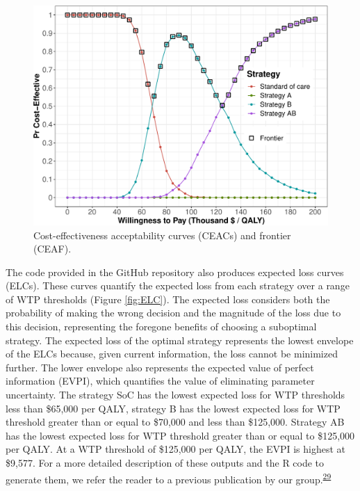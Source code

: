 \documentclass[
]{article}
\begin{document}
\begin{figure}[H]

{\centering \includegraphics{figs/CEAC-1} 

}

\caption{Cost-effectiveness acceptability curves (CEACs) and frontier (CEAF).}\label{fig:CEAC}
\end{figure}

The code provided in the GitHub repository also produces expected loss curves (ELCs). These curves quantify the expected loss from each strategy over a range of WTP thresholds (Figure \ref{fig:ELC}). The expected loss considers both the probability of making the wrong decision and the magnitude of the loss due to this decision, representing the foregone benefits of choosing a suboptimal strategy. The expected loss of the optimal strategy represents the lowest envelope of the ELCs because, given current information, the loss cannot be minimized further. The lower envelope also represents the expected value of perfect information (EVPI), which quantifies the value of eliminating parameter uncertainty. The strategy SoC has the lowest expected loss for WTP thresholds less than \$65,000 per QALY, strategy B has the lowest expected loss for WTP threshold greater than or equal to \$70,000 and less than \$125,000. Strategy AB has the lowest expected loss for WTP threshold greater than or equal to \$125,000 per QALY. At a WTP threshold of \$125,000 per QALY, the EVPI is highest at \$9,577. For a more detailed description of these outputs and the R code to generate them, we refer the reader to a previous publication by our group.\textsuperscript{\protect\hyperlink{ref-Alarid-Escudero2019}{29}}
\end{document}
